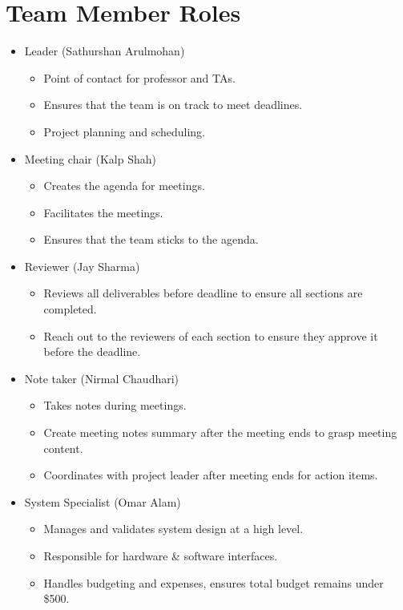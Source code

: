 \documentclass{article}
\begin{document}
\section{Team Member Roles}

\begin{itemize}
  \item Leader (Sathurshan Arulmohan)
    \begin{itemize}
      \item Point of contact for professor and TAs. 
      \item Ensures that the team is on track to meet deadlines.
      \item Project planning and scheduling.
    \end{itemize}
  \item Meeting chair (Kalp Shah)
    \begin{itemize}
      \item Creates the agenda for meetings.
      \item Facilitates the meetings.
      \item Ensures that the team sticks to the agenda.
    \end{itemize}
  \item Reviewer (Jay Sharma)
    \begin{itemize}
      \item Reviews all deliverables before deadline to ensure all sections are completed.
      \item Reach out to the reviewers of each section to ensure they approve it before the deadline.
    \end{itemize}
  \item Note taker (Nirmal Chaudhari)
    \begin{itemize}
      \item Takes notes during meetings.
      \item Create meeting notes summary after the meeting ends to grasp meeting content.
      \item Coordinates with project leader after meeting ends for action items. 
    \end{itemize}
  \item System Specialist (Omar Alam)
    \begin{itemize}
      \item Manages and validates system design at a high level. 
      \item Responsible for hardware \& software interfaces.
      \item Handles budgeting and expenses, ensures total budget remains under \$500.
    \end{itemize}
\end{itemize}
\end{document}
